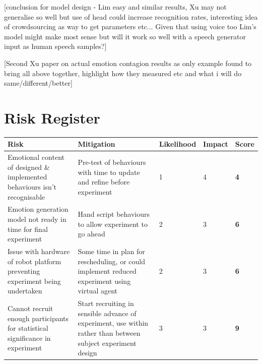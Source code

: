 \documentclass[11pt]{article}
\begin{document}

[conclusion for model design - Lim easy and similar results, Xu may not generalise so well but use of head could increase recognition rates, interesting idea of crowdsourcing as way to get parameters etc... Given that using voice too Lim's model might make most sense but will it work so well with a speech generator input as human speech samples?]

[Second Xu paper on actual emotion contagion results as only example found to bring all above together, highlight how they measured etc and what i will do same/different/better]

\section{Risk Register}
\begin{center}
	\begin{tabular}{|m{6cm}|m{5cm}|m{1.8cm}|m{1cm}|m{1cm}|}
		\hline
		Risk & Mitigation & Likelihood & Impact & \textbf{Score} \\
		\hline 
		Emotional content of designed \& implemented behaviours isn’t recognisable & Pre-test of behaviours with time to update and refine before experiment & 1 & 4 & \textbf{4} \\ 
		\hline
		Emotion generation model not ready in time for final experiment & Hand script behaviours to allow experiment to go ahead & 2 & 3 & \textbf{6} \\ 
		\hline
		Issue with hardware of robot platform preventing experiment being undertaken & Some time in plan for rescheduling, or could implement reduced experiment using virtual agent & 2 & 3 & \textbf{6} \\
		\hline 
		Cannot recruit enough participants for statistical significance in experiment & Start recruiting in sensible advance of experiment, use within rather than between subject experiment design & 3 & 3 & \textbf{9} \\
		\hline
	\end{tabular} 
\end{center}
\end{document}
